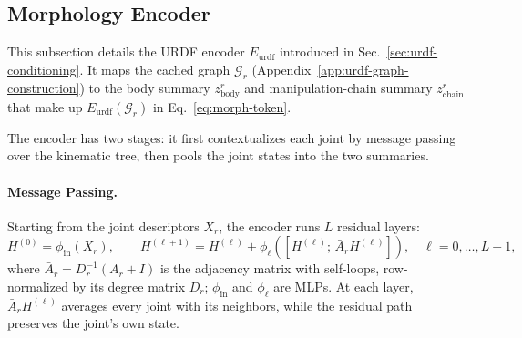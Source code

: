 \subsection{Morphology Encoder}
\label{app:morphology-encoder-details}


This subsection details the URDF encoder $E_{\mathrm{urdf}}$ introduced in Sec.~\ref{sec:urdf-conditioning}. It maps the cached graph $\mathcal{G}_r$ (Appendix~\ref{app:urdf-graph-construction}) to the body summary $z_{\mathrm{body}}^{r}$ and manipulation-chain summary $z_{\mathrm{chain}}^{r}$ that make up $E_{\mathrm{urdf}}(\mathcal{G}_r)$ in Eq.~\ref{eq:morph-token}.

The encoder has two stages: it first contextualizes each joint by message passing over the kinematic tree, then pools the joint states into the two summaries.

\paragraph{Message Passing.}
Starting from the joint descriptors $X_r$, the encoder runs $L$ residual layers:
\begin{equation}
    H^{(0)} = \phi_{\mathrm{in}}(X_r),
    \qquad
    H^{(\ell+1)}
    =
    H^{(\ell)}
    +
    \phi_{\ell}
    \!\left(
    \left[
    H^{(\ell)};\,
    \bar{A}_r H^{(\ell)}
    \right]
    \right),
    \quad \ell = 0,\dots,L-1,
\end{equation}
where $\bar{A}_r = D_r^{-1}(A_r + I)$ is the adjacency matrix with self-loops, row-normalized by its degree matrix $D_r$; $\phi_{\mathrm{in}}$ and $\phi_{\ell}$ are MLPs. At each layer, $\bar{A}_r H^{(\ell)}$ averages every joint with its neighbors, while the residual path preserves the joint's own state.

